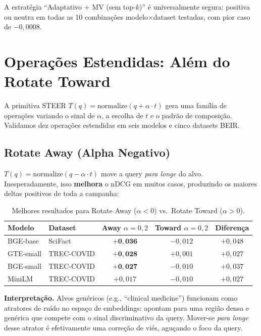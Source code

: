 \documentclass{article}
\begin{document}
A estratégia ``Adaptativo + MV (sem top-$k$)'' é universalmente segura: positiva ou neutra em todas as 10 combinações modelo$\times$dataset testadas, com pior caso de $-0{,}0008$.

\section{Operações Estendidas: Além do Rotate Toward}
\label{sec:extended}

A primitiva STEER $T(q) = \text{normalize}(q + \alpha \cdot t)$ gera uma família de operações variando o sinal de $\alpha$, a escolha de $t$ e o padrão de composição. Validamos dez operações estendidas em seis modelos e cinco datasets BEIR.

\subsection{Rotate Away (Alpha Negativo)}

$T(q) = \text{normalize}(q - \alpha \cdot t)$ move a query \emph{para longe} do alvo. Inesperadamente, isso \textbf{melhora} o nDCG em muitos casos, produzindo os maiores deltas positivos de toda a campanha:

\begin{table}[h]
\centering
\caption{Melhores resultados para Rotate Away ($\alpha < 0$) vs.\ Rotate Toward ($\alpha > 0$).}
\begin{tabular}{llccc}
\toprule
Modelo & Dataset & Away $\alpha{=}0{,}2$ & Toward $\alpha{=}0{,}2$ & Diferença \\
\midrule
BGE-base & SciFact & $\mathbf{+0{,}036}$ & $-0{,}012$ & $+0{,}048$ \\
GTE-small & TREC-COVID & $\mathbf{+0{,}028}$ & $+0{,}001$ & $+0{,}027$ \\
BGE-small & TREC-COVID & $\mathbf{+0{,}027}$ & $-0{,}010$ & $+0{,}037$ \\
MiniLM & TREC-COVID & $+0{,}017$ & $-0{,}010$ & $+0{,}027$ \\
\bottomrule
\end{tabular}
\end{table}

\noindent\textbf{Interpretação.} Alvos genéricos (e.g., ``clinical medicine'') funcionam como atratores de ruído no espaço de embeddings: apontam para uma região densa e genérica que compete com o sinal discriminativo da query. Mover-se \emph{para longe} desse atrator é efetivamente uma correção de viés, aguçando o foco da query.
\end{document}
